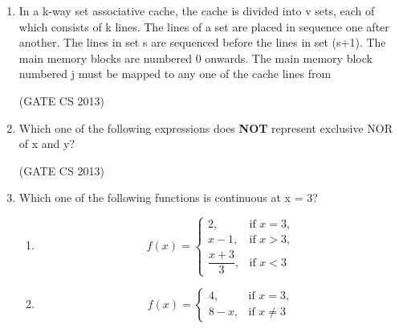 \documentclass[a4paper, 11pt]{article}
\begin{document}
\begin{enumerate}
    \item In a k-way set associative cache, the cache is divided into v sets, each of which consists of k lines. The lines of a set are placed in sequence one after another. The lines in set s are sequenced before the lines in set (s+1). The main memory blocks are numbered 0 onwards. The main memory block numbered j must be mapped to any one of the cache lines from
    \begin{enumerate}
    \end{enumerate}

    \hfill (GATE CS 2013)

    \item Which one of the following expressions does \textbf{NOT} represent exclusive NOR of x and y?
    \begin{enumerate}
    \end{enumerate}

    \hfill (GATE CS 2013)
    
    \item Which one of the following functions is continuous at x = 3? 
    \begin{enumerate} 
    
    \item
    \[
    f(x) =
    \begin{cases} 
    2, & \text{if } x = 3,\\ 
    x - 1, & \text{if } x > 3,\\ 
    \dfrac{x+3}{3}, & \text{if } x < 3 
    \end{cases}
    \]
     
    \item  
    \[
    f(x) = 
    \begin{cases} 
    4, & \text{if } x = 3,\\ 
    8 - x, & \text{if } x \neq 3
    \end{cases}
    \]
    

\end{enumerate}
\end{enumerate}
\end{document}
